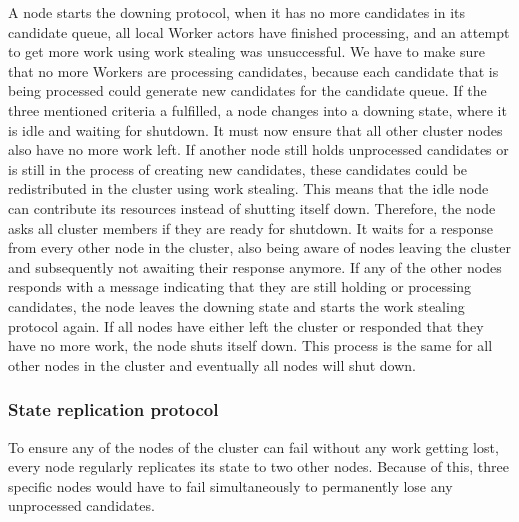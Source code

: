   A node starts the downing protocol, when it has no more candidates in its candidate queue, all local Worker actors have finished processing, and an attempt to get more work using work stealing was unsuccessful.
  We have to make sure that no more Workers are processing candidates, because each candidate that is being processed could generate new candidates for the candidate queue.
  If the three mentioned criteria a fulfilled, a \dodo{} node changes into a downing state, where it is idle and waiting for shutdown.
  It must now ensure that all other cluster nodes also have no more work left.
  If another node still holds unprocessed candidates or is still in the process of creating new candidates, these candidates could be redistributed in the cluster using work stealing.
  This means that the idle node can contribute its resources instead of shutting itself down.
  Therefore, the node asks all cluster members if they are ready for shutdown.
  It waits for a response from every other node in the cluster, also being aware of nodes leaving the cluster and subsequently not awaiting their response anymore.
  If any of the other nodes responds with a message indicating that they are still holding or processing candidates, the node leaves the downing state and starts the work stealing protocol again.
  If all nodes have either left the cluster or responded that they have no more work, the node shuts itself down.
  This process is the same for all other nodes in the cluster and eventually all nodes will shut down.

\subsubsection{State replication protocol}\label{protocol:stateReplication}
  To ensure any of the nodes of the cluster can fail without any work getting lost, every node regularly replicates its state to two other nodes.
  Because of this, three specific nodes would have to fail simultaneously to permanently lose any unprocessed candidates.
  
